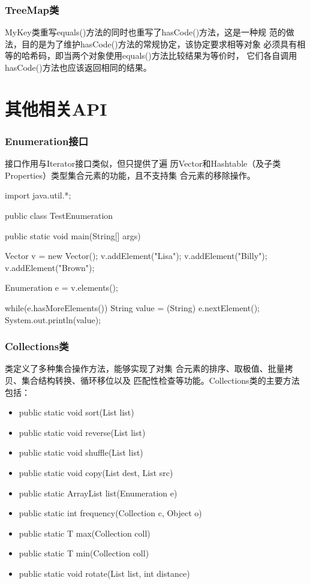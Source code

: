 \begin{frame}[fragile] %
  \frametitle{TreeMap类}

  {\kai MyKey类重写equals()方法的同时也重写了hasCode()方法，这是一种规
    范的做法，目的是为了维护hasCode()方法的常规协定，该协定要求相等对象
    必须具有相等的哈希码，即当两个对象使用equals()方法比较结果为等价时，
    它们各自调用hasCode()方法也应该返回相同的结果。}
\end{frame}

\section{其他相关API}
\begin{frame}[fragile] %
  \frametitle{Enumeration接口}

   接口作用与Iterator接口类似，但只提供了遍
  历Vector和Hashtable（及子类Properties）类型集合元素的功能，且不支持集
  合元素的移除操作。

  \begin{javaCode}
    import java.util.*;

    public class TestEnumeration {
      public static void main(String[] args) {
        Vector v = new Vector();
        v.addElement("Lisa");
        v.addElement("Billy");
        v.addElement("Brown");

        Enumeration e = v.elements();

        while(e.hasMoreElements()) {
          String value = (String) e.nextElement();
          System.out.println(value);
        }
      }
    }
  \end{javaCode}
\end{frame}

\begin{frame}[fragile] %
  \frametitle{Collections类}

   类定义了多种集合操作方法，能够实现了对集
  合元素的{\Blue\hei 排序、取极值、批量拷贝、集合结构转换、循环移位以及
    匹配性检查}等功能。Collections类的主要方法包括：

  \begin{itemize}\small
  \item public static void sort(List list)
  \item public static void reverse(List list)
  \item public static void shuffle(List list)
  \item public static void copy(List dest, List src)
  \item public static ArrayList list(Enumeration e)
  \item public static int frequency(Collection c, Object o)
  \item public static T max(Collection coll)
  \item public static T min(Collection coll)
  \item public static void rotate(List list, int distance)
  \end{itemize}
\end{frame}

